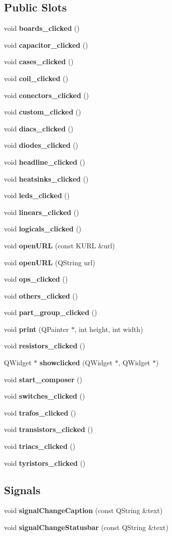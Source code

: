 \subsection*{Public Slots}
\begin{CompactItemize}
\item 
void {\bf boards\_\-clicked} ()
\item 
void {\bf capacitor\_\-clicked} ()
\item 
void {\bf cases\_\-clicked} ()
\item 
void {\bf coil\_\-clicked} ()
\item 
void {\bf conectors\_\-clicked} ()
\item 
void {\bf custom\_\-clicked} ()
\item 
void {\bf diacs\_\-clicked} ()
\item 
void {\bf diodes\_\-clicked} ()
\item 
void {\bf headline\_\-clicked} ()
\item 
void {\bf heatsinks\_\-clicked} ()
\item 
void {\bf leds\_\-clicked} ()
\item 
void {\bf linears\_\-clicked} ()
\item 
void {\bf logicals\_\-clicked} ()
\item 
void {\bf open\-URL} (const KURL \&url)
\item 
void {\bf open\-URL} (QString url)
\item 
void {\bf ops\_\-clicked} ()
\item 
void {\bf others\_\-clicked} ()
\item 
void {\bf part\_\-group\_\-clicked} ()
\item 
void {\bf print} (QPainter $\ast$, int height, int width)
\item 
void {\bf resistors\_\-clicked} ()
\item 
QWidget $\ast$ {\bf showclicked} (QWidget $\ast$, QWidget $\ast$)
\item 
void {\bf start\_\-composer} ()
\item 
void {\bf switches\_\-clicked} ()
\item 
void {\bf trafos\_\-clicked} ()
\item 
void {\bf transistors\_\-clicked} ()
\item 
void {\bf triacs\_\-clicked} ()
\item 
void {\bf tyristors\_\-clicked} ()
\end{CompactItemize}
\subsection*{Signals}
\begin{CompactItemize}
\item 
void {\bf signal\-Change\-Caption} (const QString \&text)
\item 
void {\bf signal\-Change\-Statusbar} (const QString \&text)
\end{CompactItemize}

